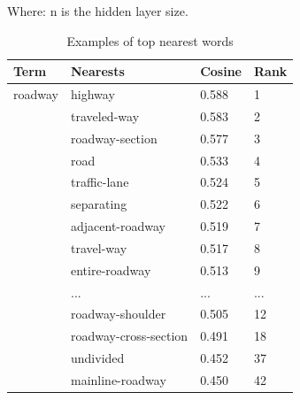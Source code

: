 \documentclass[Journal,InsideFigs, DoubleSpace]{ascelike} %
\begin{document}
Where: n is the hidden layer size.
%
\begin{table} [t]
	\caption{Examples of top nearest words}
	\label{table:nearest_example}
	\centering
	\small
	\renewcommand{\arraystretch}{1.25}
	\begin{tabular}{l l l  l}
		\hline
		\textbf{Term} & \textbf{Nearests} & \textbf{Cosine} &\textbf{Rank}\\
		\hline
		roadway			& highway & 0.588 & 1\\
		& traveled-way & 0.583 & 2\\
		& roadway-section & 0.577 & 3\\
		& road & 0.533 & 4\\
		& traffic-lane & 0.524 &5\\
		& separating & 0.522 &6\\
		& adjacent-roadway & 0.519 & 7\\
		& travel-way & 0.517 & 8\\
		& entire-roadway & 0.513 & 9\\
		& ...&...& ...\\
		& roadway-shoulder & 0.505 & 12\\
		& roadway-cross-section & 0.491 & 18\\
		& undivided & 0.452 & 37\\
		& mainline-roadway & 0.450 & 42\\
		\hline
	\end{tabular}
	\normalsize
\end{table}
\end{document}
